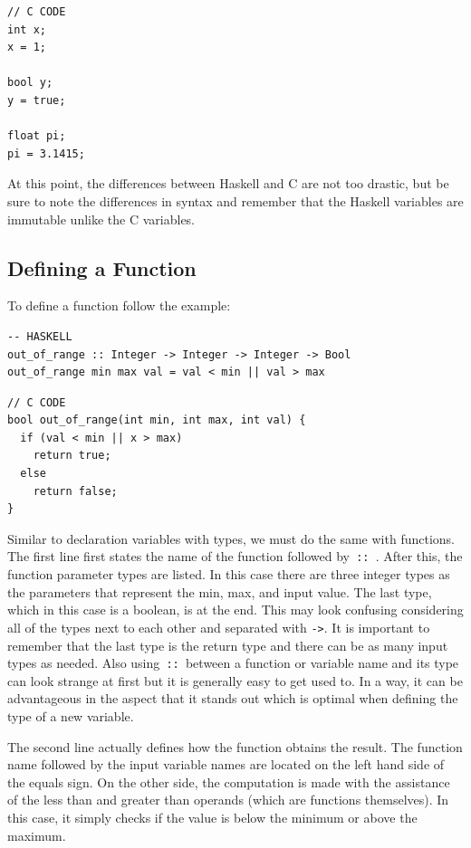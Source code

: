 \documentclass{article}
\begin{document}
\begin{lstlisting}[style=CStyle]
// C CODE
int x;
x = 1;

bool y;
y = true;

float pi;
pi = 3.1415;
\end{lstlisting}

\medskip\noindent
At this point, the differences between Haskell and C are not too drastic, but be sure to note the differences in syntax and remember that the Haskell variables are immutable unlike the C variables.

\subsection{Defining a Function}
\medskip\noindent
To define a function follow the example:

\begin{lstlisting}[style=HaskellStyle]
-- HASKELL
out_of_range :: Integer -> Integer -> Integer -> Bool
out_of_range min max val = val < min || val > max
\end{lstlisting}

\begin{lstlisting}[style=CStyle]
// C CODE
bool out_of_range(int min, int max, int val) {
  if (val < min || x > max)
    return true;
  else
    return false;
}
\end{lstlisting}

\medskip\noindent
Similar to declaration variables with types, we must do the same with functions. The first line first states the name of the function followed by\verb| :: |. After this, the function parameter types are listed. In this case there are three integer types as the parameters that represent the min, max, and input value. The last type, which in this case is a boolean, is at the end. This may look confusing considering all of the types next to each other and separated with \verb|->|. It is important to remember that the last type is the return type and there can be as many input types as needed. Also using\verb| :: |between a function or variable name and its type can look strange at first but it is generally easy to get used to. In a way, it can be advantageous in the aspect that it stands out which is optimal when defining the type of a new variable.

\medskip\noindent
The second line actually defines how the function obtains the result. The function name followed by the input variable names are located on the left hand side of the equals sign. On the other side, the computation is made with the assistance of the less than and greater than operands (which are functions themselves). In this case, it simply checks if the value is below the minimum or above the maximum.
\end{document}
